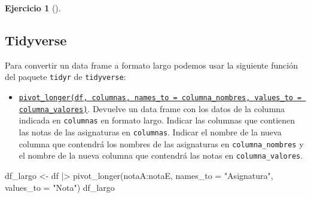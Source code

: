 \documentclass[
  a4paper,
]{scrreport}
\newenvironment{Shaded}{\begin{snugshade}}{\end{snugshade}}
\newcommand{\AttributeTok}[1]{\textcolor[rgb]{0.40,0.45,0.13}{#1}}
\newcommand{\FunctionTok}[1]{\textcolor[rgb]{0.28,0.35,0.67}{#1}}
\newcommand{\NormalTok}[1]{\textcolor[rgb]{0.00,0.23,0.31}{#1}}
\newcommand{\OtherTok}[1]{\textcolor[rgb]{0.00,0.23,0.31}{#1}}
\newcommand{\SpecialCharTok}[1]{\textcolor[rgb]{0.37,0.37,0.37}{#1}}
\newcommand{\StringTok}[1]{\textcolor[rgb]{0.13,0.47,0.30}{#1}}
\providecommand{\tightlist}{%
  \setlength{\itemsep}{0pt}\setlength{\parskip}{0pt}}\usepackage{longtable,booktabs,array}
\theoremstyle{definition}
\newtheorem{exercise}{Ejercicio}[chapter]
\theoremstyle{remark}
\begin{document}
\begin{exercise}[]
\begin{enumerate}
\begin{tcolorbox}
  \section{Tidyverse}

  Para convertir un data frame a formato largo podemos usar la siguiente
  función del paquete \texttt{tidyr} de \texttt{tidyverse}:

  \begin{itemize}
  \tightlist
  \item
    \href{https://tidyr.tidyverse.org/reference/pivot_longer.html}{\texttt{pivot\_longer(df,\ columnas,\ names\_to\ =\ columna\_nombres,\ values\_to\ =\ columna\_valores)}}.
    Devuelve un data frame con los datos de la columna indicada en
    \texttt{columnas} en formato largo. Indicar las columnas que
    contienen las notas de las asignaturas en \texttt{columnas}. Indicar
    el nombre de la nueva columna que contendrá los nombres de las
    asignaturas en \texttt{columna\_nombres} y el nombre de la nueva
    columna que contendrá las notas en \texttt{columna\_valores}.
  \end{itemize}

\begin{Shaded}
\begin{Highlighting}[]
\NormalTok{df\_largo }\OtherTok{\textless{}{-}}\NormalTok{ df }\SpecialCharTok{|\textgreater{}} \FunctionTok{pivot\_longer}\NormalTok{(notaA}\SpecialCharTok{:}\NormalTok{notaE, }\AttributeTok{names\_to =} \StringTok{"Asignatura"}\NormalTok{, }\AttributeTok{values\_to =} \StringTok{"Nota"}\NormalTok{)}
\NormalTok{df\_largo}
\end{Highlighting}
\end{Shaded}


\end{tcolorbox}
\end{enumerate}
\end{exercise}
\end{document}
